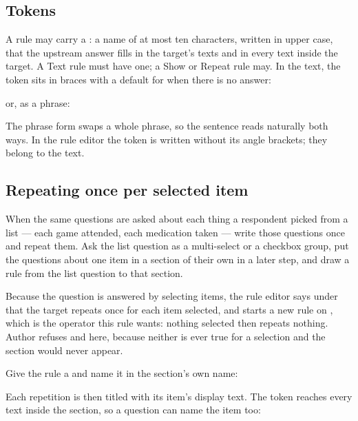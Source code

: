 \documentclass[11pt, a4paper]{article}
\begin{document}
\subsection{Tokens}

A rule may carry a : a name of at most ten characters, written in upper case, that
the upstream answer fills in the target's texts and in every text inside the target. A Text
rule must have one; a Show or Repeat rule may. In the text, the token sits in braces with a
default for when there is no answer:

\begin{center}\small
{} \qquad or, as a phrase: \qquad {}
\end{center}

The phrase form swaps a whole phrase, so the sentence reads naturally both ways. In the rule
editor the token is written without its angle brackets; they belong to the text.

\subsection{Repeating once per selected item}

When the same questions are asked about each thing a respondent picked from a list — each game
attended, each medication taken — write those questions once and repeat them. Ask the list
question as a multi-select or a checkbox group, put the questions about one item in a section of
their own in a later step, and draw a  rule from the list question to that section.

Because the question is answered by selecting items, the rule editor says under 
that the target repeats once for each item selected, and starts a new rule on
, which is the operator this rule wants: nothing selected then repeats nothing.
Author refuses  and  here, because neither is ever true for a
selection and the section would never appear.

Give the rule a  and name it in the section's own name:

\begin{quote}
\end{quote}

Each repetition is then titled with its item's display text. The token reaches every text inside
the section, so a question can name the item too:
\end{document}
